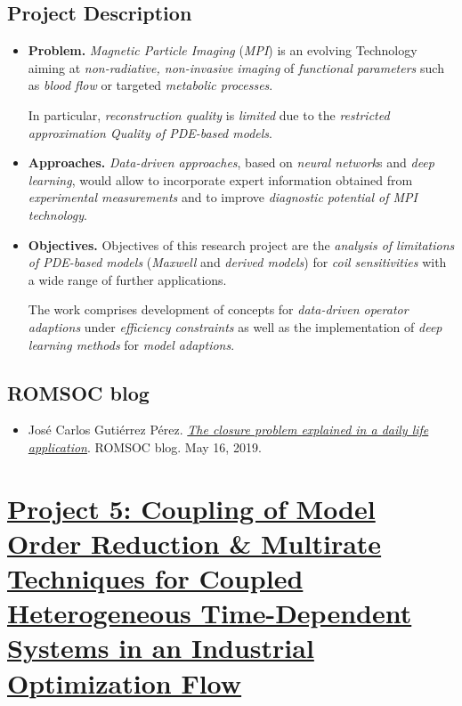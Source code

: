 \documentclass{book}
\numberwithin{equation}{section}
\begin{document}
\section{Project Description}
\begin{itemize}
    \item \textbf{Problem.} \textit{Magnetic Particle Imaging} (\textit{MPI}) is an evolving Technology aiming at \textit{non-radiative, non-invasive imaging} of \textit{functional parameters} such as \textit{blood flow} or targeted \textit{metabolic processes}.
    
    In particular, \textit{reconstruction quality} is \textit{limited} due to the \textit{restricted approximation Quality of PDE-based models}.
    \item \textbf{Approaches.} \textit{Data-driven approaches}, based on \textit{neural network}s and \textit{deep learning}, would allow to incorporate expert information obtained from \textit{experimental measurements} and to improve \textit{diagnostic potential of MPI technology}.
    \item \textbf{Objectives.} Objectives of this research project are the \textit{analysis of limitations of PDE-based models} (\textit{Maxwell} and \textit{derived models}) for \textit{coil sensitivities} with a wide range of further applications.
    
    The work comprises development of concepts for \textit{data-driven operator adaptions} under \textit{efficiency constraints} as well as the implementation of \textit{deep learning methods} for \textit{model adaptions}.
\end{itemize}

\section{ROMSOC blog}
\begin{itemize}
    \item José Carlos Gutiérrez Pérez. \href{https://www.romsoc.eu/the-closure-problem-explained-in-a-daily-life-application/}{\textit{The closure problem explained in a daily life application}}. ROMSOC blog. May 16, 2019.
\end{itemize}


\chapter{\href{https://www.romsoc.eu/coupling-of-model-order-reduction-and-multirate-techniques-for-coupled-heterogeneous-time-dependent-systems-in-an-industrial-optimization-flow/}{Project 5: Coupling of Model Order Reduction \& Multirate Techniques for Coupled Heterogeneous Time-Dependent Systems in an Industrial Optimization Flow}}
\end{document}

